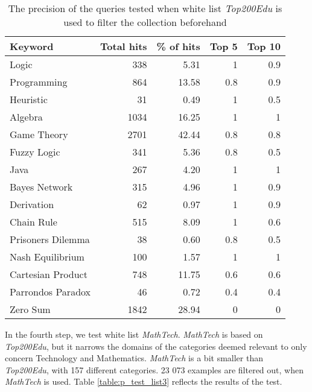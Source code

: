 \begin{table}[h]
\centering
\small
\begin{tabular} {|| p{10em} | r | r | r | r ||} 
 \hline
 Keyword & Total hits & \% of hits & Top 5 & Top 10 \\ [0.5ex] 
 \hline

Logic & 338 & 5.31 & 1 & 0.9 \\
Programming & 864 & 13.58 & 0.8 & 0.9 \\
Heuristic & 31 & 0.49 & 1 & 0.5 \\
Algebra & 1034 & 16.25 & 1 & 1 \\
Game Theory & 2701 & 42.44 & 0.8 & 0.8 \\
\hline
Fuzzy Logic & 341 & 5.36 & 0.8 & 0.5 \\
Java & 267 & 4.20 & 1 & 1 \\
Bayes Network & 315 & 4.96 & 1 & 0.9 \\
Derivation & 62 & 0.97 & 1 & 0.9 \\
\hline
Chain Rule & 515 & 8.09 & 1 & 0.6 \\
Prisoners Dilemma & 38 & 0.60 & 0.8 & 0.5 \\
Nash Equilibrium & 100 & 1.57 & 1 & 1 \\
Cartesian Product & 748 & 11.75 & 0.6 & 0.6 \\
Parrondos Paradox & 46 & 0.72 & 0.4 & 0.4 \\
Zero Sum & 1842 & 28.94 & 0 & 0 \\

 \hline
\end{tabular}
\caption{The precision of the queries tested when white list \textit{Top200Edu} is used to filter the collection beforehand}
\label{table:p_test_list2}
\end{table}
\clearpage

In the fourth step, we test white list \textit{MathTech}. \textit{MathTech} is based on \textit{Top200Edu}, but it narrows the domains of the categories deemed relevant to only concern Technology and Mathematics. \textit{MathTech} is a bit smaller than \textit{Top200Edu}, with 157 different categories. 23 073 examples are filtered out, when \textit{MathTech} is used. Table \ref{table:p_test_list3} reflects the results of the test.

